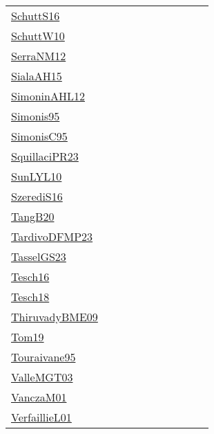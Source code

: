 {\begin{longtable}{p{3cm}p{4cm}p{2cm}p{2cm}p{2cm}p{2cm}p{2cm}p{2cm}p{2cm}p{2cm}}
\href{papers/SchuttS16.pdf}{SchuttS16}~\cite{SchuttS16} &  &  &  &  &  &  &  &  & \\
\href{papers/SchuttW10.pdf}{SchuttW10}~\cite{SchuttW10} &  &  &  &  &  &  &  &  & \\
\href{papers/SerraNM12.pdf}{SerraNM12}~\cite{SerraNM12} &  &  &  &  &  &  &  &  & \\
\href{papers/SialaAH15.pdf}{SialaAH15}~\cite{SialaAH15} &  &  &  &  &  &  &  &  & \\
\href{papers/SimoninAHL12.pdf}{SimoninAHL12}~\cite{SimoninAHL12} &  &  &  &  &  &  &  &  & \\
\href{papers/Simonis95.pdf}{Simonis95}~\cite{Simonis95} &  &  &  &  &  &  &  &  & \\
\href{papers/SimonisC95.pdf}{SimonisC95}~\cite{SimonisC95} &  &  &  &  &  &  &  &  & \\
\href{papers/SquillaciPR23.pdf}{SquillaciPR23}~\cite{SquillaciPR23} &  &  &  &  &  &  &  &  & \\
\href{papers/SunLYL10.pdf}{SunLYL10}~\cite{SunLYL10} &  &  &  &  &  &  &  &  & \\
\href{papers/SzerediS16.pdf}{SzerediS16}~\cite{SzerediS16} &  &  &  &  &  &  &  &  & \\
\href{papers/TangB20.pdf}{TangB20}~\cite{TangB20} &  &  &  &  &  &  &  &  & \\
\href{papers/TardivoDFMP23.pdf}{TardivoDFMP23}~\cite{TardivoDFMP23} &  &  &  &  &  &  &  &  & \\
\href{papers/TasselGS23.pdf}{TasselGS23}~\cite{TasselGS23} &  &  &  &  &  &  &  &  & \\
\href{papers/Tesch16.pdf}{Tesch16}~\cite{Tesch16} &  &  &  &  &  &  &  &  & \\
\href{papers/Tesch18.pdf}{Tesch18}~\cite{Tesch18} &  &  &  &  &  &  &  &  & \\
\href{papers/ThiruvadyBME09.pdf}{ThiruvadyBME09}~\cite{ThiruvadyBME09} &  &  &  &  &  &  &  &  & \\
\href{papers/Tom19.pdf}{Tom19}~\cite{Tom19} &  &  &  &  &  &  &  &  & \\
\href{papers/Touraivane95.pdf}{Touraivane95}~\cite{Touraivane95} &  &  &  &  &  &  &  &  & \\
\href{papers/ValleMGT03.pdf}{ValleMGT03}~\cite{ValleMGT03} &  &  &  &  &  &  &  &  & \\
\href{papers/VanczaM01.pdf}{VanczaM01}~\cite{VanczaM01} &  &  &  &  &  &  &  &  & \\
\href{papers/VerfaillieL01.pdf}{VerfaillieL01}~\cite{VerfaillieL01} &  &  &  &  &  &  &  &  & \\

\end{longtable}}
